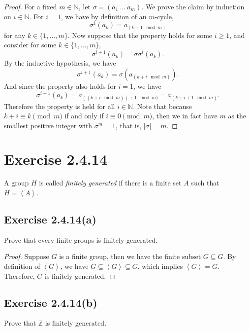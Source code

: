 \documentclass[12pt]{article}
\newenvironment{problem}
    {\begin{lrbox}{\mybox}\begin{minipage}{\textwidth-10pt}}
    {\end{minipage}\end{lrbox}\framebox[6.5in]{\usebox{\mybox}}}
\newcommand{\<}{\left\langle}
\renewcommand{\>}{\right\rangle}
\newcommand{\N}{\mathbb{N}}
\newcommand{\Z}{\mathbb{Z}}
\begin{document}
\begin{proof}
    For a fixed $m\in\N$, let $\sigma=(a_1\ \dots\ a_m)$. We prove the claim by induction on $i\in\N$. For $i=1$, we have by definition of an $m$-cycle,
    \[\sigma^1(a_k) = a_{(k+1 \mod m)}\]
    for any $k\in\{1,\dots,m\}$. Now suppose that the property holds for some $i\geq 1$, and consider for some $k\in\{1,\dots,m\}$,
    \[\sigma^{i+1}(a_k) = \sigma\sigma^i(a_k).\]
    By the inductive hypothesis, we have
    \[\sigma^{i+1}(a_k) = \sigma(a_{(k+i \mod m)}).\]
    And since the property also holds for $i=1$, we have
    \[\sigma^{i+1}(a_k) = a_{((k+i \mod m))+1 \mod m)} = a_{(k+i+1 \mod m)}.\]
    Therefore the property is held for all $i\in\N$. Note that because $k+i \equiv k \pmod m$ if and only if $i\equiv0\pmod m$, then we in fact have $m$ as the smallest positive integer with $\sigma^m=1$, that is, $|\sigma|=m$.
    
\end{proof}

\newpage
\section*{Exercise 2.4.14}
\begin{problem}
     A group $H$ is called \emph{finitely generated} if there is a finite set $A$ such that $H=\<A\>$.
\end{problem}

\subsection*{Exercise 2.4.14(a)}
\begin{problem}
     Prove that every finite groups is finitely generated.
\end{problem}

\begin{proof}
    Suppose $G$ is a finite group, then we have the finite subset $G\subseteq G$. By definition of $\<G\>$, we have $G\subseteq\<G\>\subseteq G$, which implies $\<G\>=G$. Therefore, $G$ is finitely generated.
    
\end{proof}

\subsection*{Exercise 2.4.14(b)}
\begin{problem}
     Prove that $\Z$ is finitely generated.
\end{problem}
\end{document}
